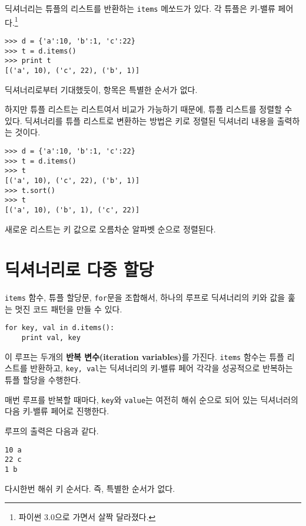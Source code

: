 딕셔너리는 튜플의 리스트를 반환하는 {\tt items} 메쏘드가 있다. 각 튜플은 키-밸류 페어다.\footnote{파이썬 3.0으로 가면서 살짝 달라졌다.}

\beforeverb
\begin{verbatim}
>>> d = {'a':10, 'b':1, 'c':22}
>>> t = d.items()
>>> print t
[('a', 10), ('c', 22), ('b', 1)]
\end{verbatim}
\afterverb
%

딕셔너리로부터 기대했듯이, 항목은 특별한 순서가 없다.

하지만 튜플 리스트는 리스트여서 비교가 가능하기 때문에, 튜플 리스트를 정렬할 수 있다.
딕셔너리를 튜플 리스트로 변환하는 방법은 키로 정렬된 딕셔너리 내용을 출력하는 것이다.

\beforeverb
\begin{verbatim}
>>> d = {'a':10, 'b':1, 'c':22}
>>> t = d.items()
>>> t
[('a', 10), ('c', 22), ('b', 1)]
>>> t.sort()
>>> t
[('a', 10), ('b', 1), ('c', 22)]
\end{verbatim}
\afterverb
%

새로운 리스트는 키 값으로 오름차순 알파벳 순으로 정렬된다.

\section{딕셔너리로 다중 할당}


{\tt items} 함수, 튜플 할당문, {\tt for}문을 조합해서, 하나의 루프로 딕셔너리의 키와 값을 훑는 멋진 코드 패턴을 만들 수 있다.

\beforeverb
\begin{verbatim}
for key, val in d.items():
    print val, key
\end{verbatim}
\afterverb
%

이 루프는 두개의 {\bf 반복 변수(iteration variables)}를 가진다.
{\tt items} 함수는 튜플 리스트를 반환하고, {\tt key, val}는 딕셔너리의 키-밸류 페어 각각을 성공적으로 반복하는 
튜플 할당을 수행한다.

매번 루프를 반복할 때마다, {\tt key}와 {\tt value}는 여전히 해쉬 순으로 되어 있는 딕셔너러의 다음 키-밸류 페어로 진행한다.

루프의 출력은 다음과 같다.

\beforeverb
\begin{verbatim}
10 a
22 c
1 b
\end{verbatim}
\afterverb
%
다시한번 해쉬 키 순서다. 즉, 특별한 순서가 없다.

